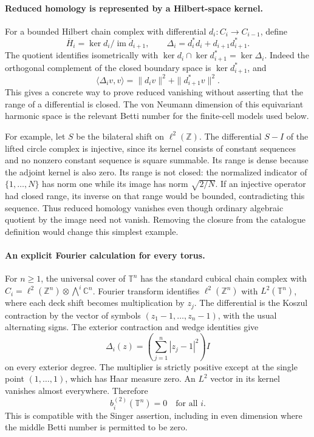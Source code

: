 \documentclass[11pt]{article}
\begin{document}
\paragraph{Reduced homology is represented by a Hilbert-space kernel.}
For a bounded Hilbert chain complex with differential
$d_i:C_i\to C_{i-1}$, define
\[
 \overline H_i=\ker d_i/\overline{\operatorname{im}d_{i+1}},
 \qquad
 \Delta_i=d_i^*d_i+d_{i+1}d_{i+1}^*.
\]
The quotient identifies isometrically with
$\ker d_i\cap\ker d_{i+1}^*=\ker\Delta_i$.
Indeed the orthogonal complement of the closed boundary space is
$\ker d_{i+1}^*$, and
\[
 \langle\Delta_i v,v\rangle
       =\|d_iv\|^2+\|d_{i+1}^*v\|^2.
\]
This gives a concrete way to prove reduced vanishing without asserting
that the range of a differential is closed. The von Neumann dimension
of this equivariant harmonic space is the relevant Betti number for
the finite-cell models used below.

For example, let $S$ be the bilateral shift on $\ell^2(\mathbb Z)$.
The differential $S-I$ of the lifted circle complex is injective,
since its kernel consists of constant sequences and no nonzero constant
sequence is square summable. Its range is dense because the adjoint
kernel is also zero. Its range is not closed: the normalized indicator
of $\{1,\ldots,N\}$ has norm one while its image has norm
$\sqrt{2/N}$. If an injective operator had closed range, its inverse
on that range would be bounded, contradicting this sequence.
Thus reduced homology vanishes even though ordinary algebraic quotient
by the image need not vanish. Removing the closure from the catalogue
definition would change this simplest example.

\paragraph{An explicit Fourier calculation for every torus.}
For $n\ge1$, the universal cover of $\mathbb T^n$ has the standard cubical chain
complex with
$C_i=\ell^2(\mathbb Z^n)\otimes\bigwedge^i\mathbb C^n$.
Fourier transform identifies $\ell^2(\mathbb Z^n)$ with
$L^2(\mathbb T^n)$, where each deck shift becomes multiplication by
$z_j$. The differential is the Koszul contraction by the vector of
symbols $(z_1-1,\ldots,z_n-1)$, with the usual alternating signs.
The exterior contraction and wedge identities give
\[
                  \Delta_i(z)=
       \left(\sum_{j=1}^n|z_j-1|^2\right)I
\]
on every exterior degree. The multiplier is strictly positive except
at the single point $(1,\ldots,1)$, which has Haar measure zero.
An $L^2$ vector in its kernel vanishes almost everywhere. Therefore
\[
                   b_i^{(2)}(\mathbb T^n)=0
                   \quad\text{for all }i.
\]
This is compatible with the Singer assertion, including in even
dimension where the middle Betti number is permitted to be zero.
\end{document}
